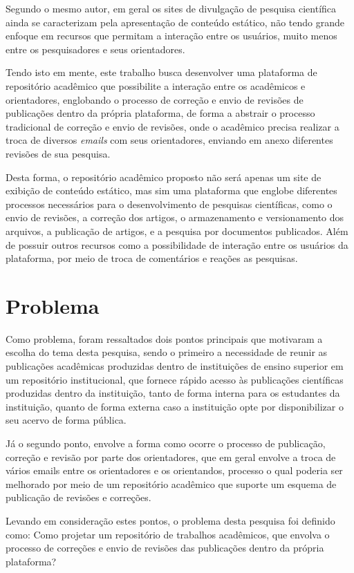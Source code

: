 Segundo o mesmo autor, em geral os sites de divulgação de pesquisa
científica ainda se caracterizam pela apresentação de conteúdo estático,
não tendo grande enfoque em recursos que permitam a interação entre os
usuários, muito menos entre os pesquisadores e seus orientadores.

Tendo isto em mente, este trabalho busca desenvolver uma plataforma de
repositório acadêmico que possibilite a interação entre os acadêmicos e
orientadores, englobando o processo de correção e envio de revisões de
publicações dentro da própria plataforma, de forma a abstrair o processo
tradicional de correção e envio de revisões, onde o acadêmico precisa
realizar a troca de diversos \emph{emails} com seus orientadores,
enviando em anexo diferentes revisões de sua pesquisa.

Desta forma, o repositório acadêmico proposto não será apenas um site
de exibição de conteúdo estático, mas sim uma plataforma que englobe
diferentes processos necessários para o desenvolvimento de pesquisas
científicas, como o envio de revisões, a correção dos artigos,
o armazenamento e versionamento dos arquivos, a publicação de artigos,
e a pesquisa por documentos publicados. Além de possuir outros recursos
como a possibilidade de interação entre os usuários da plataforma,
por meio de troca de comentários e reações as pesquisas.

\section{Problema} \label{sec::Problem}

Como problema, foram ressaltados dois pontos principais que motivaram a escolha do tema desta pesquisa, sendo o primeiro a necessidade de reunir as publicações acadêmicas produzidas dentro de instituições de ensino superior em um repositório institucional, que fornece rápido acesso às publicações científicas produzidas dentro da instituição, tanto de forma interna para os estudantes da instituição, quanto de forma externa caso a instituição opte por disponibilizar o seu acervo de forma pública.

Já o segundo ponto, envolve a forma como ocorre o processo de publicação, correção e revisão por parte dos orientadores, que em geral envolve a troca de vários emails entre os orientadores e os orientandos, processo o qual poderia ser melhorado por meio de um repositório acadêmico que suporte um esquema de publicação de revisões e correções.

Levando em consideração estes pontos, o problema desta pesquisa foi definido como: Como projetar um repositório de trabalhos acadêmicos, que envolva o processo de correções e envio de revisões das publicações dentro da própria plataforma?


